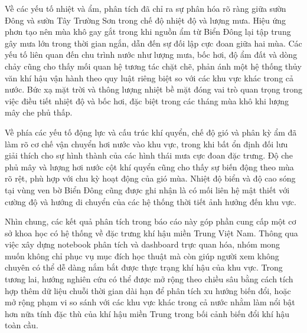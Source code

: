 \documentclass[12pt,a4paper]{article}
\begin{document}
Về các yếu tố nhiệt và ẩm, phân tích đã chỉ ra sự phân hóa rõ ràng giữa sườn Đông và sườn Tây Trường Sơn trong chế độ nhiệt độ và lượng mưa. Hiệu ứng phơn tạo nên mùa khô gay gắt trong khi nguồn ẩm từ Biển Đông lại tập trung gây mưa lớn trong thời gian ngắn, dẫn đến sự đối lập cực đoan giữa hai mùa. Các yếu tố liên quan đến chu trình nước như lượng mưa, bốc hơi, độ ẩm đất và dòng chảy cũng cho thấy mối quan hệ tương tác chặt chẽ, phản ánh một hệ thống thủy văn khí hậu vận hành theo quy luật riêng biệt so với các khu vực khác trong cả nước. Bức xạ mặt trời và thông lượng nhiệt bề mặt đóng vai trò quan trọng trong việc điều tiết nhiệt độ và bốc hơi, đặc biệt trong các tháng mùa khô khi lượng mây che phủ thấp.

Về phía các yếu tố động lực và cấu trúc khí quyển, chế độ gió và phân kỳ ẩm đã làm rõ cơ chế vận chuyển hơi nước vào khu vực, trong khi bất ổn định đối lưu giải thích cho sự hình thành của các hình thái mưa cực đoan đặc trưng. Độ che phủ mây và lượng hơi nước cột khí quyển cũng cho thấy sự biến động theo mùa rõ rệt, phù hợp với chu kỳ hoạt động của gió mùa. Nhiệt độ biển và độ cao sóng tại vùng ven bờ Biển Đông cũng được ghi nhận là có mối liên hệ mật thiết với cường độ và hướng di chuyển của các hệ thống thời tiết ảnh hưởng đến khu vực.

Nhìn chung, các kết quả phân tích trong báo cáo này góp phần cung cấp một cơ sở khoa học có hệ thống về đặc trưng khí hậu miền Trung Việt Nam. Thông qua việc xây dựng notebook phân tích và dashboard trực quan hóa, nhóm mong muốn không chỉ phục vụ mục đích học thuật mà còn giúp người xem không chuyên có thể dễ dàng nắm bắt được thực trạng khí hậu của khu vực. Trong tương lai, hướng nghiên cứu có thể được mở rộng theo chiều sâu bằng cách tích hợp thêm dữ liệu chuỗi thời gian dài hạn để phân tích xu hướng biến đổi, hoặc mở rộng phạm vi so sánh với các khu vực khác trong cả nước nhằm làm nổi bật hơn nữa tính đặc thù của khí hậu miền Trung trong bối cảnh biến đổi khí hậu toàn cầu.
\end{document}
